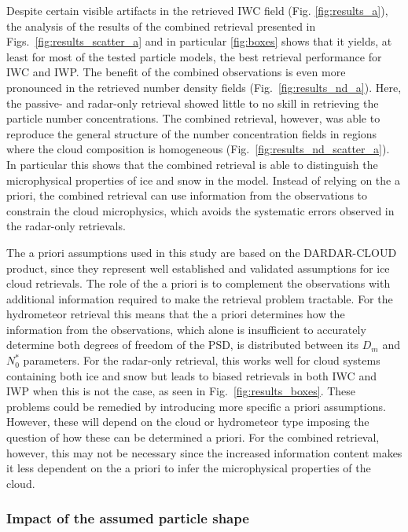 \documentclass[journal abbreviation, manuscript]{copernicus}
\begin{document}
Despite certain visible artifacts in the retrieved IWC field (Fig.
\ref{fig:results_a}), the analysis of the results of the combined retrieval
presented in Figs.~\ref{fig:results_scatter_a} 
and in particular \ref{fig:boxes} shows that it yields, at least for most of the
tested particle models, the best retrieval performance for IWC and IWP. The
benefit of the combined observations is even more pronounced in the retrieved
number density fields (Fig.~\ref{fig:results_nd_a}). Here, the passive- and
radar-only retrieval showed little to no skill in retrieving the particle number
concentrations. The combined retrieval, however, was able to reproduce the
general structure of the number concentration fields in regions where the cloud
composition is homogeneous (Fig.~\ref{fig:results_nd_scatter_a}). In particular
this shows that the combined retrieval is able to distinguish the microphysical
properties of ice and snow in the model. Instead of relying on the a priori,
the combined retrieval can use information from the observations to constrain the
cloud microphysics, which avoids the systematic errors observed in the radar-only
retrievals.

The a priori assumptions used in this study are based on the DARDAR-CLOUD
product, since they represent well established and validated assumptions for ice
cloud retrievals. The role of the a priori is to complement the observations
with additional information required to make the retrieval problem tractable.
For the hydrometeor retrieval this means that the a priori determines how the
information from the observations, which alone is insufficient to accurately
determine both degrees of freedom of the PSD, is distributed between its $D_m$
and $N_0^*$ parameters. For the radar-only retrieval, this works well for cloud
systems containing both ice and snow but leads to biased retrievals in both IWC
and IWP when this is not the case, as seen in Fig.~\ref{fig:results_boxes}.
These problems could be remedied by introducing more specific a priori
assumptions. However, these will depend on the cloud or hydrometeor type
imposing the question of how these can be determined a priori. For the combined
retrieval, however, this may not be necessary since the increased information
content makes it less dependent on the a priori to infer the microphysical
properties of the cloud.

\subsubsection{Impact of the assumed particle shape}
\end{document}
